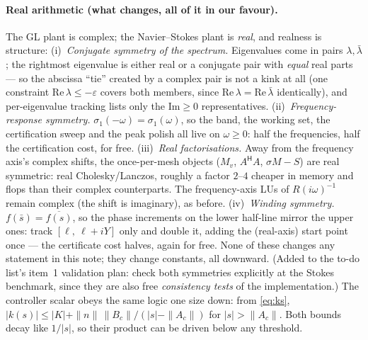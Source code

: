 \documentclass[11pt,a4paper]{article}
\newcommand{\eps}{\varepsilon}
\newcommand{\hp}{^{\mathsf H}}
\begin{document}
{\paragraph{Real arithmetic (what changes, all of it in our favour).}  The GL plant is
complex; the Navier--Stokes plant is \emph{real}, and realness is structure:
(i)~\emph{Conjugate symmetry of the spectrum.}  Eigenvalues come in pairs
$\lambda,\bar\lambda$; the rightmost eigenvalue is either real or a conjugate pair with
\emph{equal} real parts --- so the abscissa ``tie'' created by a complex pair is not a
kink at all (one constraint $\mathrm{Re}\,\lambda\le-\eps$ covers both members, since
$\mathrm{Re}\,\lambda=\mathrm{Re}\,\bar\lambda$ identically), and per-eigenvalue tracking
lists only the $\mathrm{Im}\ge0$ representatives.  (ii)~\emph{Frequency-response
symmetry.}  $\sigma_1(-\omega)=\sigma_1(\omega)$, so the band, the working set, the
certification sweep and the peak polish all live on $\omega\ge0$: half the frequencies,
half the certification cost, for free.  (iii)~\emph{Real factorisations.}  Away from the
frequency axis's complex shifts, the once-per-mesh objects ($M_v$, $A\hp A$, $\sigma M-S$)
are real symmetric: real Cholesky/Lanczos, roughly a factor $2$--$4$ cheaper in memory
and flops than their complex counterparts.  The frequency-axis LUs of $R(i\omega)^{-1}$
remain complex (the shift is imaginary), as before.  (iv)~\emph{Winding symmetry.}
$f(\bar s)=\overline{f(s)}$, so the phase increments on the lower half-line mirror the
upper ones: track $[\ell,\ \ell+iY]$ only and double it, adding the (real-axis) start
point once --- the certificate cost halves, again for free.  None of these changes any
statement in this note; they change constants, all downward.  (Added to the to-do list's
item~1 validation plan: check both symmetries explicitly at the Stokes benchmark, since
they are also free \emph{consistency tests} of the implementation.)
The controller scalar obeys the same logic one size down: from \eqref{eq:ks},
$|k(s)|\le|K|+\|n\|\,\|B_c\|/(|s|-\|A_c\|)$ for $|s|>\|A_c\|$.  Both bounds decay like
$1/|s|$, so their product can be driven below any threshold.

}
\end{document}
